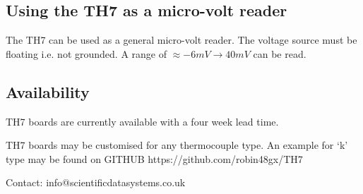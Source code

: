\documentclass[10pt,foldmark]{leaflet}
\begin{document}
\subsection{Using the TH7 as a micro-volt reader}

The TH7 can be used as a general micro-volt reader.
The voltage source must be floating i.e. not grounded.
A range of $\approx -6mV \rightarrow 40mV$ can be read.
\clearpage
\subsection{Availability}

TH7 boards are currently available with a four week lead time.

TH7 boards may be customised for any thermocouple type.
An example for `k' type may be found on GITHUB 
https://github.com/robin48gx/TH7 

\vspace{3.5cm}
\mbox{}
\vfill
{}

\vspace{0.5cm}
Contact: info@scientificdatasystems.co.uk
\end{document}
